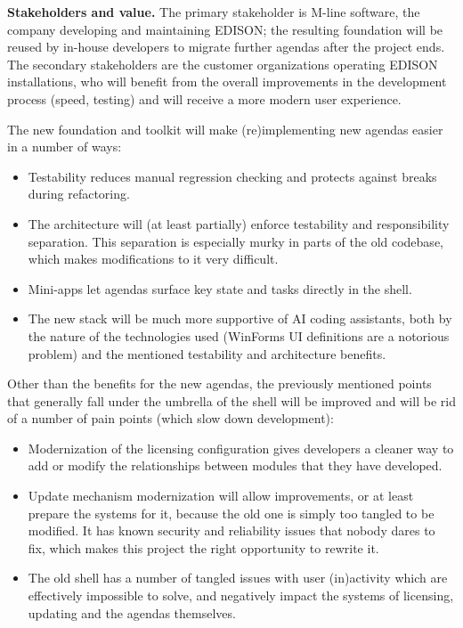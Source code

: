 \documentclass{article}
\begin{document}
\medskip
\noindent \textbf{Stakeholders and value.} The primary stakeholder is M-line software, the company developing and maintaining EDISON; the resulting foundation will be reused by in-house developers to migrate further agendas after the project ends. The secondary stakeholders are the customer organizations operating EDISON installations, who will benefit from the overall improvements in the development process (speed, testing) and will receive a more modern user experience.

\medskip
\noindent The new foundation and toolkit will make (re)implementing new agendas easier in a number of ways:
\begin{itemize}
    \item Testability reduces manual regression checking and protects against breaks during refactoring.
    \item The architecture will (at least partially) enforce testability and responsibility separation. This separation is especially murky in parts of the old codebase, which makes modifications to it very difficult.
    \item Mini-apps let agendas surface key state and tasks directly in the shell.
    \item The new stack will be much more supportive of AI coding assistants, both by the nature of the technologies used (WinForms UI definitions are a notorious problem) and the mentioned testability and architecture benefits.
\end{itemize}

Other than the benefits for the new agendas, the previously mentioned points that generally fall under the umbrella of the shell will be improved and will be rid of a number of pain points (which slow down development):
\begin{itemize}
    \item Modernization of the licensing configuration gives developers a cleaner way to add or modify the relationships between modules that they have developed.
    \item Update mechanism modernization will allow improvements, or at least prepare the systems for it, because the old one is simply too tangled to be modified. It has known security and reliability issues that nobody dares to fix, which makes this project the right opportunity to rewrite it.
    \item The old shell has a number of tangled issues with user (in)activity which are effectively impossible to solve, and negatively impact the systems of licensing, updating and the agendas themselves.
\end{itemize}
\end{document}
